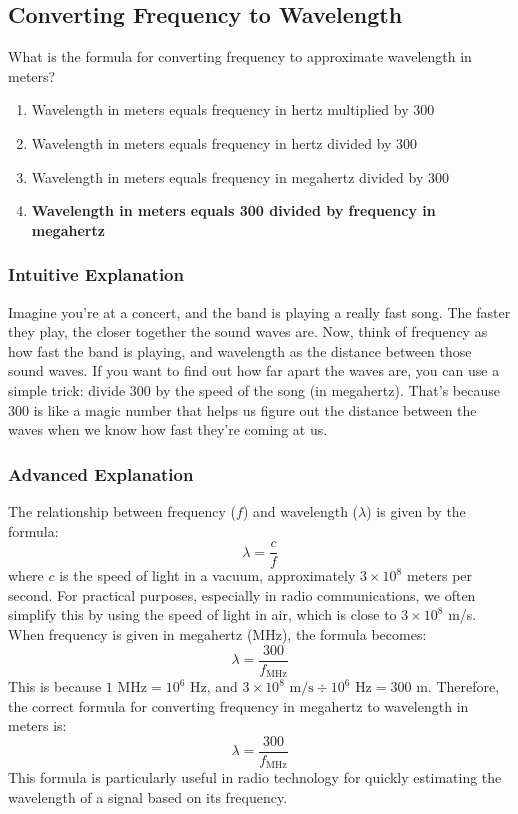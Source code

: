 \subsection{Converting Frequency to Wavelength}
\label{T3B06}

\begin{tcolorbox}[colback=gray!10!white,colframe=black!75!black,title=T3B06]
What is the formula for converting frequency to approximate wavelength in meters?
\begin{enumerate}[label=\Alph*)]
    \item Wavelength in meters equals frequency in hertz multiplied by 300
    \item Wavelength in meters equals frequency in hertz divided by 300
    \item Wavelength in meters equals frequency in megahertz divided by 300
    \item \textbf{Wavelength in meters equals 300 divided by frequency in megahertz}
\end{enumerate}
\end{tcolorbox}

\subsubsection{Intuitive Explanation}
Imagine you're at a concert, and the band is playing a really fast song. The faster they play, the closer together the sound waves are. Now, think of frequency as how fast the band is playing, and wavelength as the distance between those sound waves. If you want to find out how far apart the waves are, you can use a simple trick: divide 300 by the speed of the song (in megahertz). That's because 300 is like a magic number that helps us figure out the distance between the waves when we know how fast they're coming at us.

\subsubsection{Advanced Explanation}
The relationship between frequency (\(f\)) and wavelength (\(\lambda\)) is given by the formula:
\[
\lambda = \frac{c}{f}
\]
where \(c\) is the speed of light in a vacuum, approximately \(3 \times 10^8\) meters per second. For practical purposes, especially in radio communications, we often simplify this by using the speed of light in air, which is close to \(3 \times 10^8\) m/s. When frequency is given in megahertz (MHz), the formula becomes:
\[
\lambda = \frac{300}{f_{\text{MHz}}}
\]
This is because \(1 \text{ MHz} = 10^6 \text{ Hz}\), and \(3 \times 10^8 \text{ m/s} \div 10^6 \text{ Hz} = 300 \text{ m}\). Therefore, the correct formula for converting frequency in megahertz to wavelength in meters is:
\[
\lambda = \frac{300}{f_{\text{MHz}}}
\]
This formula is particularly useful in radio technology for quickly estimating the wavelength of a signal based on its frequency.

